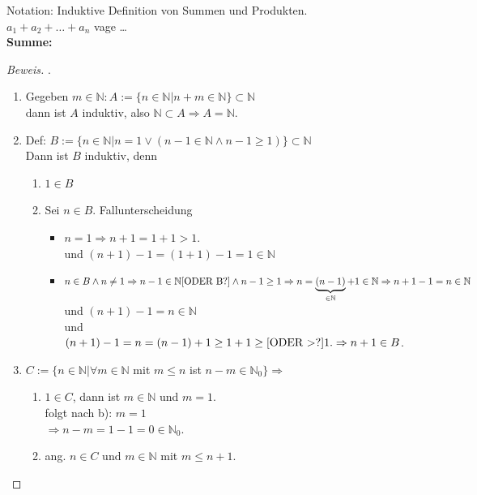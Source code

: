 \documentclass[12pt,a4paper,titlepage]{article} %
\theoremstyle{definition}
\theoremstyle{remark}
\newenvironment{bew}{\begin{proof}[Beweis]}{\end{proof}}
\begin{document}
Notation: Induktive Definition von Summen und Produkten.\\
$a_1+a_2+\ldots + a_n$ vage \dots\\
\textbf{Summe:}



\newpage
\begin{bew}.%
\begin{enumerate}
	\item Gegeben $m\in\mathbb{N}: A :=\{n\in \mathbb{N}| n+m\in \mathbb{N}\}\subset \mathbb{N}$\\
	dann ist $A$ induktiv, also $\mathbb{N}\subset A \Rightarrow A = \mathbb{N}$.
	\item Def: $B:= \{n\in \mathbb{N}|n=1 \vee (n-1\in\mathbb{N}\wedge n-1\geq 1)\} \subset \mathbb{N}$\\
	Dann ist $B$ induktiv, denn
	\begin{enumerate}
		\item $1\in B$
		\item Sei $n\in B$. Fallunterscheidung
		\begin{itemize}
			\item $n=1 \Rightarrow n+1 = 1 + 1 > 1$.\\
			und $(n+1)-1=(1+1)-1=1\in\mathbb{N}$
			\item $n\in B \wedge n \neq 1 \Rightarrow n-1 \in \mathbb{N}\text{[ODER B?]} \wedge n-1 \geq 1\\
			\Rightarrow n = \underbrace{(n-1)}_{\in\mathbb{N}}+ 1 \in \mathbb{N}\\
			\Rightarrow n+ 1-1=n \in \mathbb{N}$\\
			und $(n+1) - 1 = n \in \mathbb{N}$\\
			und $(n+1)-1 = n = (n-1)+1 \geq 1+1 \geq \text{[ODER \textgreater?]} 1.\\
			\Rightarrow n+1\in B$.
		\end{itemize}
	\end{enumerate}
	\item $C:= \{n\in \mathbb{N} | \forall m \in \mathbb{N}$ mit $m\leq n$ ist $n-m\in \mathbb{N}_0\}\Rightarrow$
	\begin{enumerate}
		\item $1\in C$, dann ist $m\in \mathbb{N}$ und $m=1$.\\
		folgt nach b): $m=1$\\
		$\Rightarrow n - m = 1 - 1 = 0\in \mathbb{N}_0$.
		\item ang. $n\in C$ und $m\in\mathbb{N}$ mit $m\leq n+1$.\\

\end{enumerate}
\end{enumerate}
\end{bew}
\end{document}
